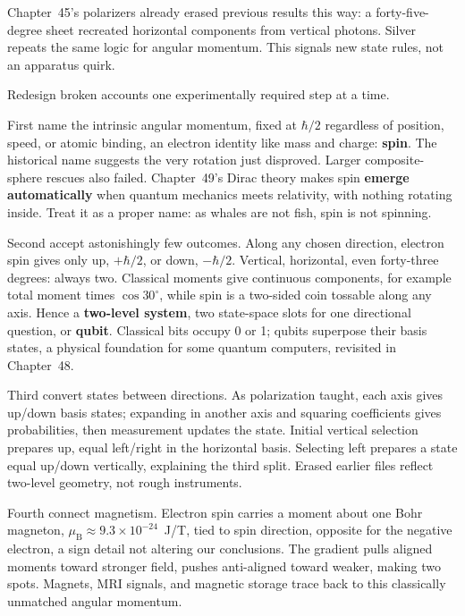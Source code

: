 Chapter~45's polarizers already erased previous results this way: a forty-five-degree sheet recreated horizontal components from vertical photons. Silver repeats the same logic for angular momentum. This signals new state rules, not an apparatus quirk.


Redesign broken accounts one experimentally required step at a time.

First name the intrinsic angular momentum, fixed at $\hbar/2$ regardless of position, speed, or atomic binding, an electron identity like mass and charge: \textbf{spin}. The historical name suggests the very rotation just disproved. Larger composite-sphere rescues also failed. Chapter~49's Dirac theory makes spin \textbf{emerge automatically} when quantum mechanics meets relativity, with nothing rotating inside. Treat it as a proper name: as whales are not fish, spin is not spinning.

Second accept astonishingly few outcomes. Along any chosen direction, electron spin gives only up, $+\hbar/2$, or down, $-\hbar/2$. Vertical, horizontal, even forty-three degrees: always two. Classical moments give continuous components, for example total moment times $\cos30^\circ$, while spin is a two-sided coin tossable along any axis. Hence a \textbf{two-level system}, two state-space slots for one directional question, or \textbf{qubit}. Classical bits occupy 0 or 1; qubits superpose their basis states, a physical foundation for some quantum computers, revisited in Chapter~48.

Third convert states between directions. As polarization taught, each axis gives up/down basis states; expanding in another axis and squaring coefficients gives probabilities, then measurement updates the state. Initial vertical selection prepares up, equal left/right in the horizontal basis. Selecting left prepares a state equal up/down vertically, explaining the third split. Erased earlier files reflect two-level geometry, not rough instruments.

Fourth connect magnetism. Electron spin carries a moment about one Bohr magneton, $\mu_{\mathrm B}\approx9.3\times10^{-24}$~J/T, tied to spin direction, opposite for the negative electron, a sign detail not altering our conclusions. The gradient pulls aligned moments toward stronger field, pushes anti-aligned toward weaker, making two spots. Magnets, MRI signals, and magnetic storage trace back to this classically unmatched angular momentum.

